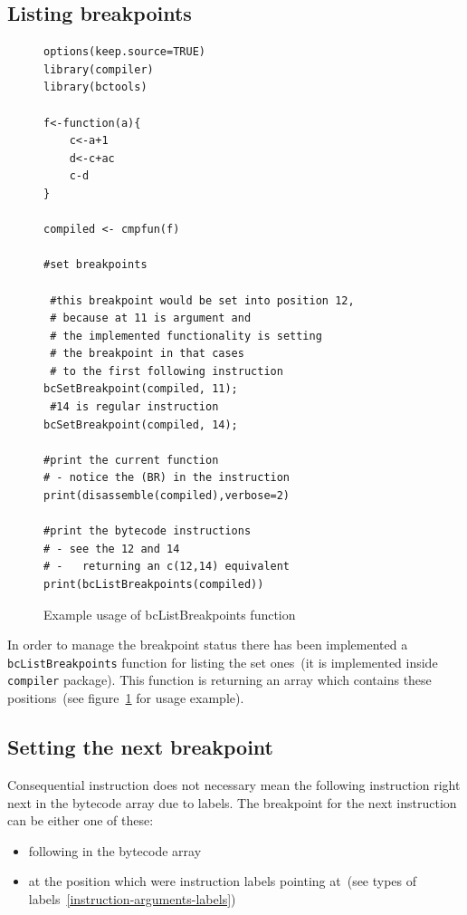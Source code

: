 \documentclass[thesis=M,english]{FITthesis}[2018/10/20]
\newcommand{\code}[1]{\texttt{#1}}
\begin{document}
\subsection{Listing breakpoints}\label{listing-breakpoints}

\begin{figure}[h]
\begin{lstlisting}
options(keep.source=TRUE)
library(compiler)
library(bctools)

f<-function(a){
    c<-a+1
    d<-c+ac
    c-d
}

compiled <- cmpfun(f)

#set breakpoints

 #this breakpoint would be set into position 12,
 # because at 11 is argument and 
 # the implemented functionality is setting 
 # the breakpoint in that cases 
 # to the first following instruction
bcSetBreakpoint(compiled, 11);
 #14 is regular instruction
bcSetBreakpoint(compiled, 14);

#print the current function 
# - notice the (BR) in the instruction
print(disassemble(compiled),verbose=2)

#print the bytecode instructions 
# - see the 12 and 14
# -   returning an c(12,14) equivalent
print(bcListBreakpoints(compiled))
\end{lstlisting}
	\caption{Example usage of bcListBreakpoints function}\label{fig:bclistbreakpoints-example}
\end{figure}

In order to manage the breakpoint status there has been implemented a \code{bcListBreakpoints} function for listing the set ones~(it is implemented inside \code{compiler} package). This function is returning an array which contains these positions~(see figure~\ref{fig:bclistbreakpoints-example} for usage example).


\subsection{Setting the next breakpoint}\label{setting-next-breakpoint}

Consequential instruction does not necessary mean the following instruction right next in the bytecode array due to labels. The breakpoint for the next instruction can be either one of these:

\begin{itemize}
	\item following in the bytecode array
	\item at the position which were instruction labels pointing at~(see types of labels~\ref{instruction-arguments-labels})
\end{itemize}
\end{document}
